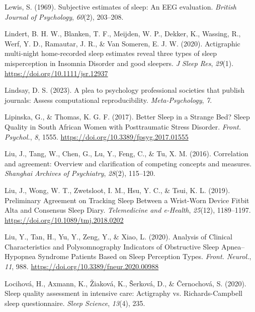 \documentclass[
]{article}
\newlength{\cslhangindent}
\newenvironment{CSLReferences}[2] %
 {\begin{list}{}{%
  \setlength{\itemindent}{0pt}
  \setlength{\leftmargin}{0pt}
  \setlength{\parsep}{0pt}
  \ifodd #1
   \setlength{\leftmargin}{\cslhangindent}
   \setlength{\itemindent}{-1\cslhangindent}
  \fi
  \setlength{\itemsep}{#2\baselineskip}}}
 {\end{list}}
\begin{document}
\begin{CSLReferences}{1}{0}
Lewis, S. (1969). Subjective estimates of sleep: An EEG evaluation. \emph{British Journal of Psychology}, \emph{60}(2), 203--208.

Lindert, B. H. W., Blanken, T. F., Meijden, W. P., Dekker, K., Wassing, R., Werf, Y. D., Ramautar, J. R., \& Van Someren, E. J. W. (2020). Actigraphic multi‐night home‐recorded sleep estimates reveal three types of sleep misperception in {Insomnia} {Disorder} and good sleepers. \emph{J Sleep Res}, \emph{29}(1). \url{https://doi.org/10.1111/jsr.12937}

Lindsay, D. S. (2023). A plea to psychology professional societies that publish journals: Assess computational reproducibility. \emph{Meta-Psychology}, \emph{7}.

Lipinska, G., \& Thomas, K. G. F. (2017). Better {Sleep} in a {Strange} {Bed}? {Sleep} {Quality} in {South} {African} {Women} with {Posttraumatic} {Stress} {Disorder}. \emph{Front. Psychol.}, \emph{8}, 1555. \url{https://doi.org/10.3389/fpsyg.2017.01555}

Liu, J., Tang, W., Chen, G., Lu, Y., Feng, C., \& Tu, X. M. (2016). Correlation and agreement: Overview and clarification of competing concepts and measures. \emph{Shanghai Archives of Psychiatry}, \emph{28}(2), 115--120.

Liu, J., Wong, W. T., Zwetsloot, I. M., Hsu, Y. C., \& Tsui, K. L. (2019). Preliminary {Agreement} on {Tracking} {Sleep} {Between} a {Wrist}-{Worn} {Device} {Fitbit} {Alta} and {Consensus} {Sleep} {Diary}. \emph{Telemedicine and e-Health}, \emph{25}(12), 1189--1197. \url{https://doi.org/10.1089/tmj.2018.0202}

Liu, Y., Tan, H., Yu, Y., Zeng, Y., \& Xiao, L. (2020). Analysis of {Clinical} {Characteristics} and {Polysomnography} {Indicators} of {Obstructive} {Sleep} {Apnea}--{Hypopnea} {Syndrome} {Patients} {Based} on {Sleep} {Perception} {Types}. \emph{Front. Neurol.}, \emph{11}, 988. \url{https://doi.org/10.3389/fneur.2020.00988}

Locihová, H., Axmann, K., Žiaková, K., Šerková, D., \& Černochová, S. (2020). Sleep quality assessment in intensive care: Actigraphy vs. {Richards}-{Campbell} sleep questionnaire. \emph{Sleep Science}, \emph{13}(4), 235.


\end{CSLReferences}
\end{document}
